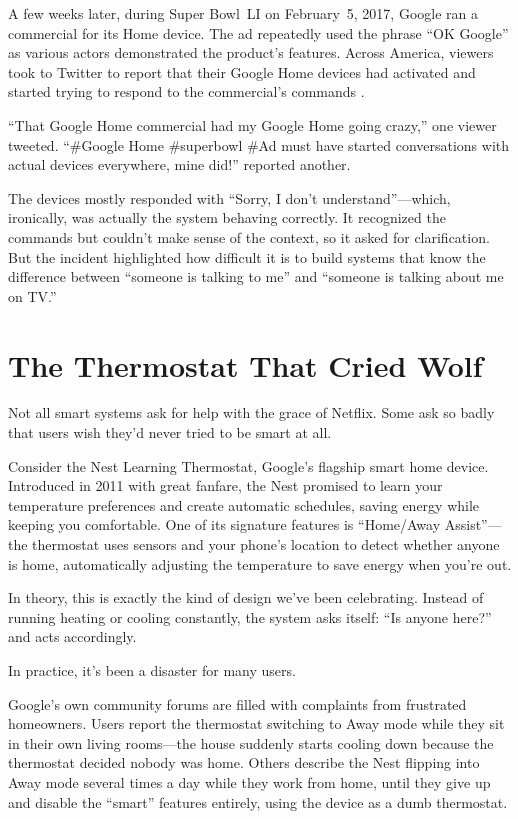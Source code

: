 A few weeks later, during Super Bowl~LI on February~5, 2017, Google ran a commercial for its Home device. The ad repeatedly used the phrase ``OK Google'' as various actors demonstrated the product's features. Across America, viewers took to Twitter to report that their Google Home devices had activated and started trying to respond to the commercial's commands \autocite{voa2017googlehome}.

``That Google Home commercial had my Google Home going crazy,'' one viewer tweeted. ``\#Google Home \#superbowl \#Ad must have started conversations with actual devices everywhere, mine did!'' reported another.

The devices mostly responded with ``Sorry, I don't understand''---which, ironically, was actually the system behaving correctly. It recognized the commands but couldn't make sense of the context, so it asked for clarification. But the incident highlighted how difficult it is to build systems that know the difference between ``someone is talking to me'' and ``someone is talking about me on TV.''

\section{The Thermostat That Cried Wolf}
\label{sec:nest-thermostat}

Not all smart systems ask for help with the grace of Netflix. Some ask so badly that users wish they'd never tried to be smart at all.

Consider the Nest Learning Thermostat, Google's flagship smart home device. Introduced in 2011 with great fanfare, the Nest promised to learn your temperature preferences and create automatic schedules, saving energy while keeping you comfortable. One of its signature features is ``Home/Away Assist''---the thermostat uses sensors and your phone's location to detect whether anyone is home, automatically adjusting the temperature to save energy when you're out.

In theory, this is exactly the kind of  design we've been celebrating. Instead of running heating or cooling constantly, the system asks itself: ``Is anyone here?'' and acts accordingly.

In practice, it's been a disaster for many users.

Google's own community forums are filled with complaints from frustrated homeowners. Users report the thermostat switching to Away mode while they sit in their own living rooms---the house suddenly starts cooling down because the thermostat decided nobody was home. Others describe the Nest flipping into Away mode several times a day while they work from home, until they give up and disable the ``smart'' features entirely, using the device as a dumb thermostat.

